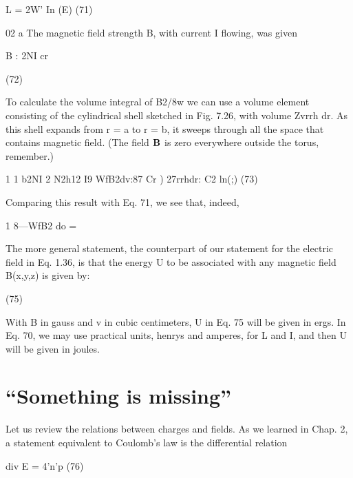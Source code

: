 \begin{equation}
\end{equation}
L = 2W' In (E) (71)

02 a
The magnetic field strength B, with current I flowing, was given

\begin{equation}
\end{equation}
B : 2NI
cr

(72)

To calculate the volume integral of B2/8w we can use a volume element
consisting of the cylindrical shell sketched in Fig. 7.26, with
volume Zvrrh dr. As this shell expands from r = a to r = b, it sweeps
through all the space that contains magnetic field. (The field $\mathbf{B}$ is
zero everywhere outside the torus, remember.)

\begin{equation}
\end{equation}
1 1 b2NI 2 N2h12 I9
WfB2dv:87  Cr ) 27rrhdr: C2 ln(;) (73)

Comparing this result with Eq. 71, we see that, indeed,

\begin{equation}
\end{equation}
1
8---WfB2 do = %

The more general statement, the counterpart of our statement for
the electric field in Eq. 1.36, is that the energy U to be associated with
any magnetic field B(x,y,z) is given by:

\begin{equation}
\end{equation}
(75)

 

With B in gauss and v in cubic centimeters, U in Eq. 75 will be given
in ergs. In Eq. 70, we may use practical units, henrys and amperes,
for L and I, and then U will be given in joules.

\section{``Something is missing''}

Let us review the relations between charges and fields. As we
learned in Chap. 2, a statement equivalent to Coulomb's law is the
differential relation

\begin{equation}
\end{equation}
div E = 4'n'p (76)

